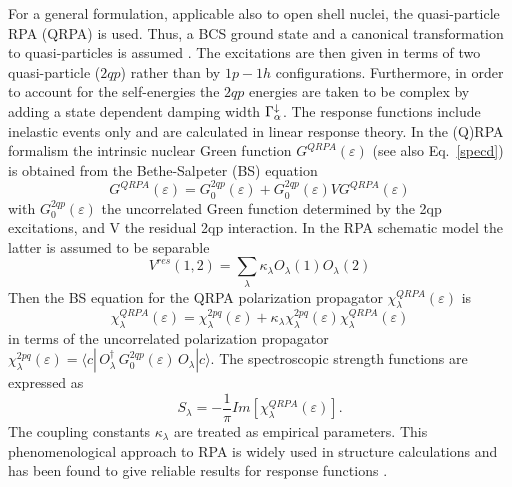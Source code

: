 For a general formulation, applicable also to open shell nuclei, the
quasi-particle RPA (QRPA) is used. Thus, a BCS%
 ground state and a canonical transformation to quasi-particles
is assumed \cite{RS}. The excitations are then given in terms of two
quasi-particle ($2qp$) rather than by $1p-1h$ configurations. Furthermore,
in order to account for the self-energies the $2qp$ energies are taken to be
complex by adding a state dependent damping width $\Gamma_{\alpha}^{%
\downarrow}$. The response functions include inelastic events only and are
calculated in linear response theory. In the (Q)RPA formalism the intrinsic
nuclear Green function $G^{QRPA}(\varepsilon)$ (see also Eq.~\ref{specd}) is
obtained from the Bethe-Salpeter (BS) equation \cite{Wal}
\begin{equation}
G^{QRPA}(\varepsilon) = G_{0}^{2qp}(\varepsilon)+
G_{0}^{2qp}(\varepsilon)VG^{QRPA}(\varepsilon)  \label{bs1}
\end{equation}
with $G_{0}^{2qp}(\varepsilon)$ the uncorrelated Green function determined
by the 2qp excitations, and V the residual 2qp interaction. In the RPA
schematic model the latter is assumed to be separable
\begin{equation}
V^{res}(1,2)=\sum_{\lambda}\kappa _{\lambda}O_{\lambda}(1)O_{\lambda}(2)
\end{equation}
Then the BS equation for the QRPA polarization propagator $%
\chi_{\lambda}^{QRPA}(\varepsilon)$ is \cite{Lenske:01}
\begin{equation}
\chi_{\lambda}^{QRPA}(\varepsilon)= \chi_{\lambda}^{2pq}(\varepsilon) +
\kappa_{\lambda}\chi_{\lambda}^{2pq}(\varepsilon)\chi_{\lambda}^{QRPA}(%
\varepsilon)  \label{bs2}
\end{equation}
in terms of the uncorrelated polarization propagator $\chi_{\lambda}^{2pq}
(\varepsilon) = \langle c|\,O_{\lambda}^{\dagger }\,G_{0}^{2qp}(\varepsilon
)\,O_{\lambda}|c\rangle$. The spectroscopic strength functions are expressed
as
\begin{equation}
S_{\lambda} =-%
\frac{1}{\pi}Im[\chi_{\lambda}^{QRPA}(\varepsilon)].  \label{sprpa}
\end{equation}
The coupling constants $\kappa_{\lambda}$ are treated as empirical
parameters. This phenomenological approach to RPA%
 is widely used in structure calculations and has been found to
give reliable results for response functions \cite{BM,Solv}.


